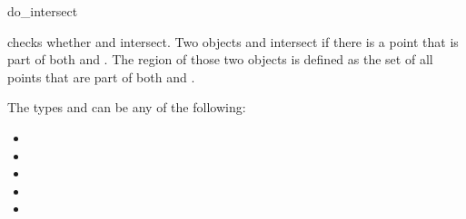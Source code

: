 \begin{ccRefFunction}{do_intersect}

{checks whether  and  intersect.  Two objects
   and  intersect if there is a point
   that is part of both  and .
  The  region of those two objects is
  defined as the set of all points  that are part of both
   and .}

The types  and  can be any of the following:
\begin{itemize}
\item {}
\item {}
\item {}
\item {}
\item {}
\end{itemize}

\ccSeeAlso {}

\end{ccRefFunction}
